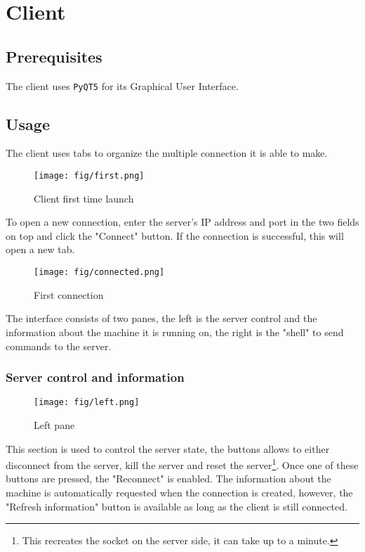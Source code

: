 \documentclass{article}
\begin{document}
\newpage
\section{Client}
\subsection{Prerequisites}
The client uses \verb|PyQT5| for its Graphical User Interface.

\subsection{Usage}
The client uses tabs to organize the multiple connection it is able to make.

\begin{figure}[H]
    \begin{center}
        \texttt{[image: fig/first.png]}
    \end{center}
    \caption{Client first time launch}
    \label{client:default}
\end{figure}

To open a new connection, enter the server's IP address and port in the two
fields on top and click the "Connect" button. If the connection is successful,
this will open a new tab.

\begin{figure}[H]
    \begin{center}
        \texttt{[image: fig/connected.png]}
    \end{center}
    \caption{First connection}
    \label{client:connected}
\end{figure}

The interface consists of two panes, the left is the server control and the
information about the machine it is running on, the right is the "shell" to send
commands to the server.

\subsubsection{Server control and information}
\begin{figure}[H]
    \begin{center}
        \texttt{[image: fig/left.png]}
    \end{center}
    \caption{Left pane}
    \label{client:left}
\end{figure}
This section is used to control the server state, the buttons allows to either
disconnect from the server, kill the server and reset the server\footnote{This
recreates the socket on the server side, it can take up to a minute.}. Once one
of these buttons are pressed, the "Reconnect" is enabled. The information about
the machine is automatically requested when the connection is created, however,
the "Refresh information" button is available as long as the client is still
connected.
\end{document}
